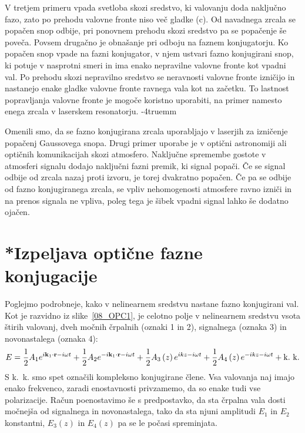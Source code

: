 V tretjem primeru vpada svetloba skozi sredstvo, ki valovanju doda naključno
fazo, zato po prehodu valovne fronte niso več gladke (c). Od navadnega zrcala
se popačen snop odbije, pri ponovnem prehodu skozi sredstvo pa se popačenje
še poveča. Povsem drugačno je obnašanje pri odboju na faznem konjugatorju. 
Ko popačen snop vpade na fazni konjugator, v njem ustvari fazno konjugirani snop, 
ki potuje v nasprotni smeri in ima enako nepravilne valovne fronte kot vpadni val. Po prehodu
skozi nepravilno sredstvo se neravnosti valovne fronte izničijo
in nastanejo enake gladke valovne fronte ravnega vala kot na začetku. 
To lastnost popravljanja valovne fronte je mogoče 
koristno uporabiti, na primer namesto enega zrcala v laserskem resonatorju.
\vglue-4truemm
\begin{remark}
Omenili smo, da se fazno konjugirana zrcala uporabljajo v laserjih za izničenje
popačenj Gaussovega snopa. Drugi primer uporabe je v optični astronomiji
ali optičnih komunikacijah skozi atmosfero. Naključne spremembe gostote v atmosferi
signalu dodajo naključni fazni premik, ki signal popači. Če se signal odbije od zrcala nazaj
proti izvoru, je torej dvakratno popačen. Če pa se odbije od fazno konjugiranega zrcala, 
se vpliv nehomogenosti atmosfere ravno izniči in na prenos signala ne vpliva, poleg
tega je šibek vpadni signal lahko še dodatno ojačen. 
\end{remark}

\section{*Izpeljava optične fazne konjugacije}
Poglejmo podrobneje, kako v nelinearnem sredstvu nastane fazno konjugirani
val. Kot je razvidno iz slike~\ref{08_OPC1}, je celotno polje v nelinearnem
sredstvu vsota štirih valovanj, dveh močnih črpalnih (oznaki 1 in 2), signalnega 
(oznaka 3) in novonastalega (oznaka 4):
\begin{equation}
E=\frac{1}{2}A_{1}e^{i{\bf k}_{1}\cdot{\bf r}-i\omega t}+\frac{1}{2}A_{2}e^{-i{\bf k}_{1}\cdot{\bf r}-
i\omega t}+\frac{1}{2}A_{3}\left(z\right)e^{ikz-i\omega t}+\frac{1}{2}A_{4}
\left(z\right)e^{-ikz-i\omega t}+\mathrm{k.~k.}
\label{8.99}
\end{equation}
S k.~k. smo spet označili kompleksno konjugirane člene.  Vsa valovanja naj imajo
enako frekvenco, zaradi enostavnosti privzamemo, da so enake tudi vse polarizacije.
Račun poenostavimo še s predpostavko, da sta črpalna vala dosti močnejša 
od signalnega in novonastalega, tako da sta njuni
amplitudi $E_{1}$ in $E_{2}$ konstantni, $E_{3}\left(z\right)$ in $E_{4}\left(z\right)$
pa se le počasi spreminjata.


